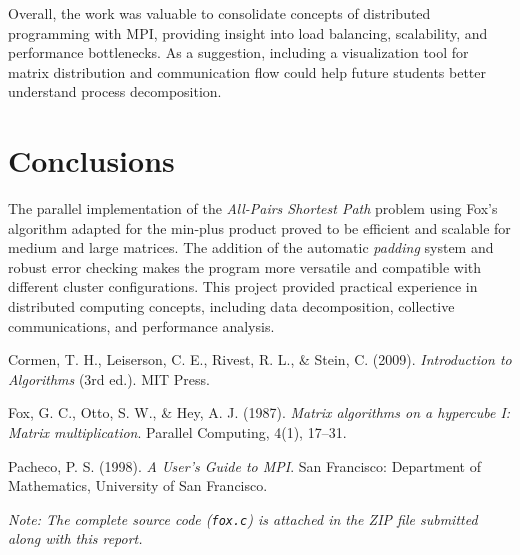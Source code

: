 \documentclass[10pt,a4paper]{article}
\begin{document}
Overall, the work was valuable to consolidate concepts of distributed programming with MPI, providing insight into load balancing, scalability, and performance bottlenecks.  
As a suggestion, including a visualization tool for matrix distribution and communication flow could help future students better understand process decomposition.

\section{Conclusions}
The parallel implementation of the \textit{All-Pairs Shortest Path} problem using Fox's algorithm adapted for the min-plus product proved to be efficient and scalable for medium and large matrices.  
The addition of the automatic \textit{padding} system and robust error checking makes the program more versatile and compatible with different cluster configurations.  
This project provided practical experience in distributed computing concepts, including data decomposition, collective communications, and performance analysis.

\begin{thebibliography}{9}
Cormen, T. H., Leiserson, C. E., Rivest, R. L., \& Stein, C. (2009).
\textit{Introduction to Algorithms} (3rd ed.).
MIT Press.

Fox, G. C., Otto, S. W., \& Hey, A. J. (1987).
\textit{Matrix algorithms on a hypercube I: Matrix multiplication}.
Parallel Computing, 4(1), 17–31.

Pacheco, P. S. (1998).
\textit{A User's Guide to MPI}.
San Francisco: Department of Mathematics, University of San Francisco.
  \end{thebibliography}

\vspace{0.3cm}
  
\textit{Note: The complete source code (\texttt{fox.c}) is attached in the ZIP file submitted along with this report.}
\end{document}
